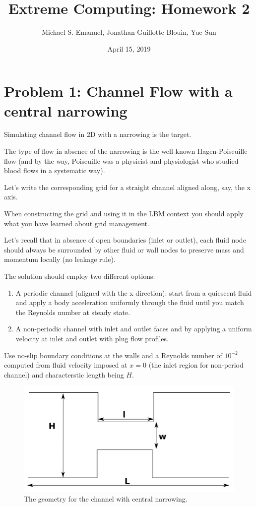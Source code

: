 \documentclass[11pt]{article}
\begin{document}
    \title{Extreme Computing: Homework 2}
    \author{Michael S. Emanuel, Jonathan Guillotte-Blouin, Yue Sun}
    \date{April 15, 2019}
    \maketitle

  \section{Problem 1:  Channel Flow with a central narrowing}
    Simulating channel flow in 2D with a narrowing is the target.

The type of flow in absence of the narrowing is the well-known Hagen-Poiseuille flow 
(and by the way, Poiseuille was a physicist and physiologist who studied blood flows 
in a systematic way).

Let's write the corresponding grid for a straight channel aligned along, say, the x axis. 

When constructing the grid and using it in the LBM context 
you should apply what you have learned about grid management. 

Let's recall that in absence of open boundaries (inlet or outlet), each fluid node should always 
be surrounded by other fluid or wall nodes to preserve mass and momentum locally (no leakage rule).

The solution should employ two different options:

    \begin{enumerate}
      \item A periodic channel (aligned with the x direction): start from a quiescent fluid and
      apply a body acceleration uniformly through the fluid until you match the Reynolds number at steady state.
      \item A non-periodic channel with inlet and outlet faces and by applying a uniform velocity 
      at inlet and outlet with plug flow profiles.
    \end{enumerate}

    Use no-slip boundary conditions at the walls and a Reynolds number of $10^{-2}$ computed from fluid velocity 
    imposed at $x=0$ (the inlet region for non-period channel) and characterstic length being $H$.

    \begin{figure}[h!]
      \centering{}\includegraphics[scale=1.0]{narrowing.png}
      \caption{The geometry for the channel with central narrowing.}
      \label{fig:narrowing}
    \end{figure}
    
\end{document}
